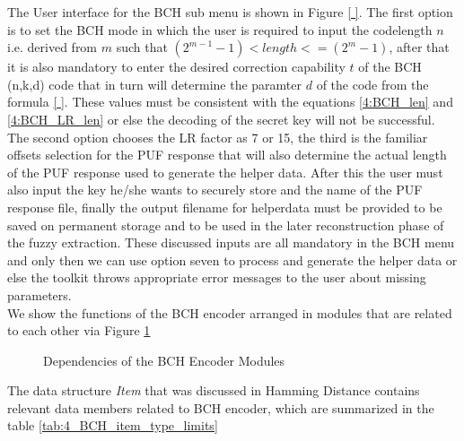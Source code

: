 The User interface for the BCH sub menu is shown in Figure \ref{ }. The first option is to set the BCH mode in which the user is required to input the codelength $n$ i.e. derived from $m$ such that $(2^{m-1} - 1) < length <= (2^m - 1)$, after that it is also mandatory to enter the desired correction capability $t$ of the BCH (n,k,d) code that in turn will determine the paramter $d$ of the code from the formula \ref{ }.
These values must be consistent with the equations \ref{4:BCH_len} and \ref{4:BCH_LR_len} or else the decoding of the secret key will not be successful. The second option chooses the LR factor as 7 or 15, the third is the familiar offsets selection for the PUF response that will also determine the actual length of the PUF response used to generate the helper data. After this the user must also input the key he/she wants to securely store and the name of the PUF
response file, finally the output filename for helperdata must be provided to be saved on permanent storage and to be used in the later reconstruction phase of the fuzzy extraction. These discussed inputs are all mandatory in the BCH menu and only then we can use option seven to process and generate the helper data or else the toolkit throws appropriate error messages to the user about missing parameters.\\

We show the functions of the BCH encoder arranged in modules that are related to each other via Figure \ref{img:bchenc_fns}

\begin{figure}
\centering
{}
\caption{Dependencies of the BCH Encoder Modules}
\label{img:bchenc_fns}
\end{figure}

The data structure \emph{Item} that was discussed in Hamming Distance contains relevant data members related to BCH encoder, which are summarized in the table \ref{tab:4_BCH_item_type_limits}

